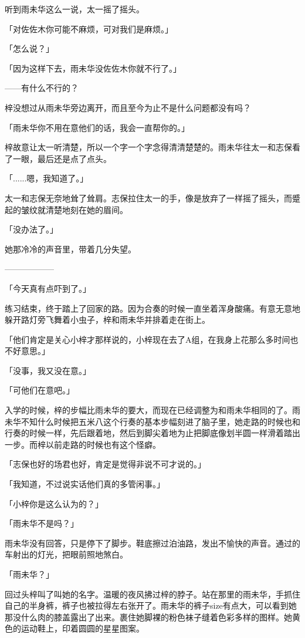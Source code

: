 \documentclass[UTF8]{ctexart}
\begin{document}
    听到雨未华这么一说，太一摇了摇头。

    「对佐佐木你可能不麻烦，可对我们是麻烦。」

    「怎么说？」

    「因为这样下去，雨未华没佐佐木你就不行了。」

    ——有什么不行的？

    梓没想过从雨未华旁边离开，而且至今为止不是什么问题都没有吗？

    「雨未华你不用在意他们的话，我会一直帮你的。」

    梓故意让太一听清楚，所以一个字一个字念得清清楚楚的。雨未华往太一和志保看了一眼，最后还是点了点头。

    「......嗯，我知道了。」

    太一和志保无奈地耸了耸肩。志保拉住太一的手，像是放弃了一样摇了摇头，而蹙起的皱纹就清楚地刻在她的眉间。

    「没办法了。」

    她那冷冷的声音里，带着几分失望。

    ——————

    「今天真有点吓到了。」

    练习结束，终于踏上了回家的路。因为合奏的时候一直坐着浑身酸痛。有意无意地躲开路灯旁飞舞着小虫子，梓和雨未华并排着走在街上。

    「他们肯定是关心小梓才那样说的，小梓现在去了A组，在我身上花那么多时间也不好意思。」

    「没事，我又没在意。」

    「可他们在意吧。」

    入学的时候，梓的步幅比雨未华的要大，而现在已经调整为和雨未华相同的了。雨未华不知什么时候把五米八这个行奏的基本步幅刻进了脑子里，她走路的时候也和行奏的时候一样，先后跟着地，然后到脚尖着地为止把脚底像划半圆一样滑着踏出一步。而梓以前走路的时候也有这个怪癖。

    「志保也好的场君也好，肯定是觉得非说不可才说的。」

    「我知道，不过说实话他们真的多管闲事。」

    「小梓你是这么认为的？」

    「雨未华不是吗？」

    雨未华没有回答，只是停下了脚步。鞋底擦过泊油路，发出不愉快的声音。通过的车射出的灯光，把眼前照地煞白。

    「雨未华？」

    回过头梓叫了叫她的名字。温暖的夜风拂过梓的脖子。站在那里的雨未华，手抓住自己的半身裤，裤子也被拉得左右张开了。雨未华的裤子size有点大，可以看到她那没什么肉的膝盖露出了出来。裹住她脚裸的粉色袜子缝着色彩多样的图样。她黄色的运动鞋上，印着圆圆的星星图案。
\end{document}

